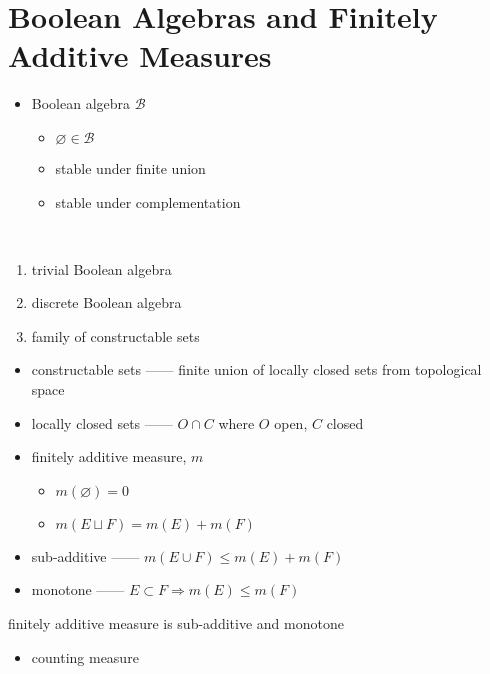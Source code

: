 \section{Boolean Algebras and Finitely Additive Measures}\label{sec:boolean-algebras-and-finitely-additive-measures}

\begin{itemize}
    \item Boolean algebra $\mathcal{B}$
    \begin{itemize}
        \item $\varnothing \in \mathcal{B}$
        \item stable under finite union
        \item stable under complementation
    \end{itemize}
\end{itemize}

\begin{example}
    \,
    \begin{enumerate}
        \item trivial Boolean algebra
        \item discrete Boolean algebra
        \item family of constructable sets
    \end{enumerate}
\end{example}

\begin{itemize}
    \item constructable sets ------ finite union of locally closed sets from topological space
    \item locally closed sets ------ $O \cap C$ where $O$ open, $C$ closed
    \item finitely additive measure, $m$
    \begin{itemize}
        \item $m(\varnothing) = 0$
        \item $m(E \sqcup F) = m(E) + m(F)$
    \end{itemize}
    \item sub-additive ------ $m(E \cup F) \leq m(E) + m(F)$
    \item monotone ------ $E \subset F \Rightarrow m(E) \leq m(F)$
\end{itemize}

\begin{fact}
    finitely additive measure is sub-additive and monotone
\end{fact}

\begin{itemize}
    \item counting measure
\end{itemize}
